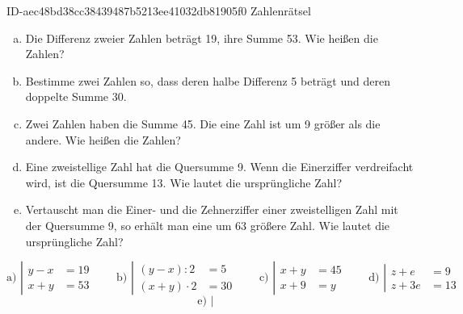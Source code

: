 \begin{exercise}
      {ID-aec48bd38cc38439487b5213ee41032db81905f0}
      {Zahlenrätsel}
  \ifproblem\problem
    \begin{enumerate}[a)]
      \item Die Differenz zweier Zahlen beträgt \num{19}, ihre Summe \num{53}. Wie heißen
            die Zahlen?
      \item Bestimme zwei Zahlen so, dass deren halbe Differenz \num{5} beträgt und deren
            doppelte Summe \num{30}.
      \item Zwei Zahlen haben die Summe \num{45}. Die eine Zahl ist um \num{9} größer als die andere.
            Wie heißen die Zahlen?
      \item Eine zweistellige Zahl hat die Quersumme \num{9}. Wenn die Einerziffer verdreifacht
            wird, ist die Quersumme \num{13}. Wie lautet die ursprüngliche Zahl?
      \item Vertauscht man die Einer- und die Zehnerziffer einer zweistelligen Zahl mit
            der Quersumme \num{9}, so erhält man eine um \num{63} größere Zahl. Wie lautet die
            ursprüngliche Zahl?
    \end{enumerate}
  \fi
  \ifoutline\outline
    \begin{equation*}
      \text{a)~}
      \left|
      \begin{split}
        y-x&=\num{19}\\
        x+y&=\num{53}
      \end{split}
      \right.
      \qquad
      \text{b)~}
      \left|
      \begin{split}
        (y-x):2&=\num{5}\\
        (x+y)\cdot2&=\num{30}
      \end{split}
      \right.
      \qquad
      \text{c)~}
      \left|
      \begin{split}
        x+y&=\num{45}\\
        x+\num{9}&=y
      \end{split}
      \right.
      \qquad
      \text{d)~}
      \left|
      \begin{split}
        z+e&=\num{9}\\
        z+3e&=\num{13}
      \end{split}
      \right.
    \end{equation*}
    \bigskip
    \begin{equation*}
      \text{e)~}
      \left|
      \begin{split}

\end{split}
\end{equation*}
\end{exercise}
